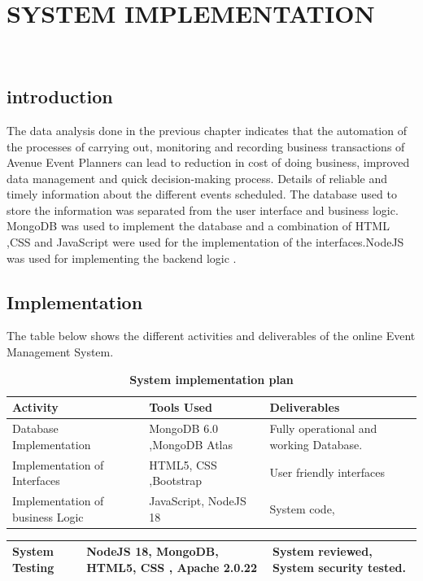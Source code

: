 
\chapter{SYSTEM IMPLEMENTATION }
\thispagestyle{empty}
\\
\section{introduction}
\hspace{.2cm} The data analysis done in the previous chapter indicates that the automation of the 
processes of carrying out, monitoring and recording business transactions of Avenue Event Planners can lead to reduction in cost of doing business, improved data 
management and quick decision-making process. Details of reliable and timely 
information about the different events scheduled. 
The database used to store the information was separated from the user interface and 
business logic. MongoDB was used to implement the database and a combination of HTML ,CSS
and JavaScript were used for the implementation of the interfaces.NodeJS was used for implementing the backend 
logic . 
\section{Implementation }
The table below shows the different activities and deliverables of the online Event Management System. 
\begin{table}[]
	\centering
	\caption{\textbf{System implementation plan }}
	\label{table }
	\begin{tabular}{|p{4.5cm}|p{4.5cm}|p{4.5cm}|}
		\hline
		Activity  & Tools Used &	Deliverables \\
		
		\hline
		Database Implementation&
		MongoDB 6.0 ,MongoDB Atlas
		& 
		Fully operational and working Database.
		
		\\
		\hline
		Implementation of Interfaces &
		HTML5, CSS ,Bootstrap
		
		&
		User friendly interfaces  
		\\
		\hline
		Implementation of business Logic &
		JavaScript, NodeJS 18
		&
		System code, 
		\\
		\hline
	\end{tabular}
\end{table}
\newpage
\begin{table}
	\centering
	
	\label{table }
	\begin{tabular}{|p{4.5cm}|p{4.5cm}|p{4.5cm}|}
		\hline
		System Testing&
		NodeJS 18, MongoDB, HTML5, CSS , Apache 
		2.0.22
		&	
		System reviewed, System 
		security tested. 
		\\
		\hline
		
	\end{tabular}
\end{table}
